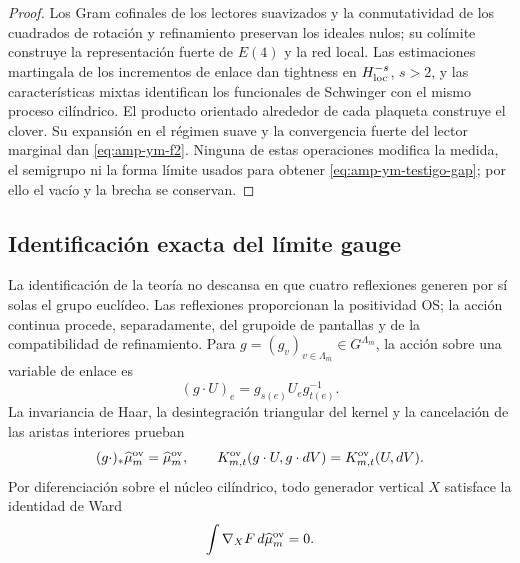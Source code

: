 \begin{proof}
Los Gram cofinales de los lectores suavizados y la conmutatividad de los
cuadrados de rotación y refinamiento preservan los ideales nulos; su
colímite construye la representación fuerte de \(E(4)\) y la red local.
Las estimaciones martingala de los incrementos de enlace dan tightness en
\(H^{-s}_{\rm loc}\), \(s>2\), y las características mixtas identifican los
funcionales de Schwinger con el mismo proceso cilíndrico. El producto
orientado alrededor de cada plaqueta construye el clover. Su expansión en
el régimen suave y la convergencia fuerte del lector marginal dan
\eqref{eq:amp-ym-f2}. Ninguna de estas operaciones modifica la medida, el
semigrupo ni la forma límite usados para obtener
\eqref{eq:amp-ym-testigo-gap}; por ello el vacío y la brecha se conservan.
\end{proof}

\subsection*{Identificación exacta del límite gauge}

La identificación de la teoría no descansa en que cuatro reflexiones
generen por sí solas el grupo euclídeo.  Las reflexiones proporcionan la
positividad OS; la acción continua procede, separadamente, del grupoide de
pantallas y de la compatibilidad de refinamiento.  Para
\(g=(g_v)_{v\in\Lambda_m}\in G^{\Lambda_m}\), la acción sobre una variable
de enlace es
\begin{equation}\label{eq:amp-ym-accion-gauge-enlace}
 (g\cdot U)_e=g_{s(e)}U_e g_{t(e)}^{-1}.
\end{equation}
La invariancia de Haar, la desintegración triangular del kernel y la
cancelación de las aristas interiores prueban
\begin{equation}\label{eq:amp-ym-invariancia-gauge-medida}
 (g\cdot)_*\widehat\mu_m^{\rm ov}=\widehat\mu_m^{\rm ov},
 \qquad
 K_{m,t}^{\rm ov}(g\cdot U,g\cdot dV)
 =K_{m,t}^{\rm ov}(U,dV).
\end{equation}
Por diferenciación sobre el núcleo cilíndrico, todo generador vertical
\(X\) satisface la identidad de Ward
\begin{equation}\label{eq:amp-ym-ward}
 \int \nabla_XF\,d\widehat\mu_m^{\rm ov}=0.
\end{equation}

